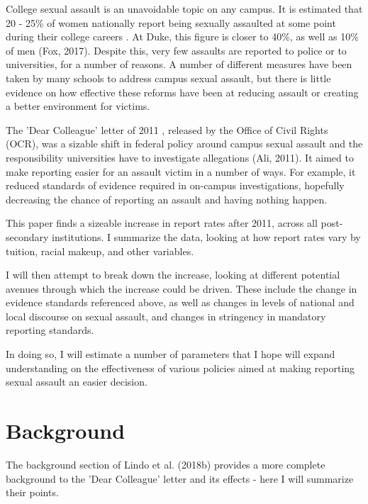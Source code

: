 \documentclass[AER]{AEA}
\begin{document}

\clearpage

College sexual assault is an unavoidable topic on any campus. It is estimated that 20 - 25\% of women nationally report being sexually assaulted at some point during their college careers \cite{fisher_sexual_2000}. At Duke, this figure is closer to 40\%, as well as 10\% of men (Fox, 2017). Despite this, very few assaults are reported to police or to universities, for a number of reasons. A number of different measures have been taken by many schools to address campus sexual assault, but there is little evidence on how effective these reforms have been at reducing assault or creating a better environment for victims. 

The 'Dear Colleague' letter of 2011 , released by the Office of Civil Rights (OCR), was a sizable shift in federal policy around campus sexual assault and the responsibility universities have to investigate allegations (Ali, 2011). It aimed to make reporting easier for an assault victim in a number of ways. For example, it reduced standards of evidence required in on-campus investigations, hopefully decreasing the chance of reporting an assault and having nothing happen. 

This paper finds a sizeable increase in report rates after 2011, across all post-secondary institutions. I summarize the data, looking at how report rates vary by tuition, racial makeup, and other variables.

I will then attempt to break down the increase, looking at different potential avenues through which the increase could be driven. These include the change in evidence standards referenced above, as well as changes in levels of national and local discourse on sexual assault, and changes in stringency in mandatory reporting standards.

In doing so, I will estimate a number of parameters that I hope will expand understanding on the effectiveness of various policies aimed at making reporting sexual assault an easier decision.


\section{Background}

The background section of Lindo et al. (2018b) provides a more complete background to the 'Dear Colleague' letter and its effects - here I will summarize their points. 
\end{document}
